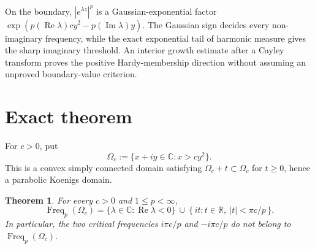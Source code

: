 \documentclass[11pt]{article}
\newtheorem{theorem}{Theorem}
\newcommand{\C}{\mathbb C}
\newcommand{\Freq}{\operatorname{Freq}}
\begin{document}
On the boundary, \(|e^{\lambda z}|^p\) is a Gaussian-exponential factor
\(\exp(p(\operatorname{Re}\lambda)c y^2-p(\operatorname{Im}\lambda)y)\).
The Gaussian sign decides every non-imaginary frequency, while the exact
exponential tail of harmonic measure gives the sharp imaginary threshold.
An interior growth estimate after a Cayley transform proves the positive
Hardy-membership direction without assuming an unproved boundary-value
criterion.

\section*{Exact theorem}

For \(c>0\), put
\[
 \Omega_c:=\{x+iy\in\C:x>c y^2\}.
\]
This is a convex simply connected domain satisfying
\(\Omega_c+t\subset\Omega_c\) for \(t\geq0\), hence a parabolic Koenigs
domain.

\begin{theorem}\label{thm:main}
For every \(c>0\) and \(1\leq p<\infty\),
\[
 \boxed{\quad
 \Freq_p(\Omega_c)
 =
 \{\lambda\in\C:\operatorname{Re}\lambda<0\}
 \ \cup\
 \{\,it:t\in\mathbb R,\ |t|<\pi c/p\,\}.
 \quad}
\]
In particular, the two critical frequencies
\(i\pi c/p\) and \(-i\pi c/p\) do not belong to
\(\Freq_p(\Omega_c)\).
\end{theorem}
\end{document}
